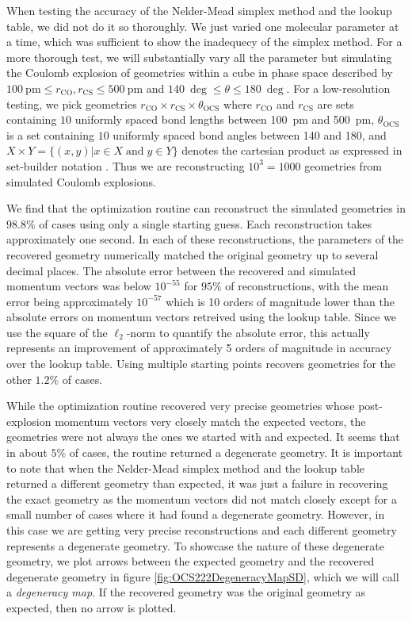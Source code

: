 When testing the accuracy of the Nelder-Mead simplex method and the lookup table, we did not do it so thoroughly. We just varied one molecular parameter at a time, which was sufficient to show the inadequecy of the simplex method. For a more thorough test, we will substantially vary all the parameter but simulating the Coulomb explosion of geometries within a cube in phase space described by $\SI{100}{\pico\meter} \le r_\mathrm{CO}, r_\mathrm{CS} \le \SI{500}{\pico\meter}$ and $\SI{140}{\deg} \le \theta \le \SI{180}{\deg}$. For a low-resolution testing, we pick geometries $r_\mathrm{CO} \times r_\mathrm{CS} \times \theta_\mathrm{OCS}$ where $r_\mathrm{CO}$ and $r_\mathrm{CS}$ are sets containing $10$ uniformly spaced bond lengths between \SI{100}{\pico\meter} and \SI{500}{\pico\meter}, $\theta_\mathrm{OCS}$ is a set containing $10$ uniformly spaced bond angles between \SI{140}{\deg} and \SI{180}{\deg}, and $X \times Y = \lbrace (x,y) | x \in X \;\mathrm{and}\; y \in Y \rbrace$ denotes the cartesian product as expressed in set-builder notation \citep[p. 6]{Warner90}. Thus we are reconstructing $10^3 = 1000$ geometries from simulated Coulomb explosions.

We find that the optimization routine can reconstruct the simulated geometries in $98.8\%$ of cases using only a single starting guess. Each reconstruction takes approximately one second. In each of these reconstructions, the parameters of the recovered geometry numerically matched the original geometry up to several decimal places. The absolute error between the recovered and simulated momentum vectors was below $10^{-55}$ for $95\%$ of reconstructions, with the mean error being approximately $10^{-57}$ which is 10 orders of magnitude lower than the absolute errors on momentum vectors retreived using the lookup table. Since we use the square of the $\ell_2$-norm to quantify the absolute error, this actually represents an improvement of approximately 5 orders of magnitude in accuracy over the lookup table. Using multiple starting points recovers geometries for the other $1.2\%$ of cases.

While the optimization routine recovered very precise geometries whose post-explosion momentum vectors very closely match the expected vectors, the geometries were not always the ones we started with and expected. It seems that in about $5\%$ of cases, the routine returned a degenerate geometry. It is important to note that when the Nelder-Mead simplex method and the lookup table returned a different geometry than expected, it was just a failure in recovering the exact geometry as the momentum vectors did not match closely except for a small number of cases where it had found a degenerate geometry. However, in this case we are getting very precise reconstructions and each different geometry represents a degenerate geometry. To showcase the nature of these degenerate geometry, we plot arrows between the expected geometry and the recovered degenerate geometry in figure \ref{fig:OCS222DegeneracyMapSD}, which we will call a \emph{degeneracy map}. If the recovered geometry was the original geometry as expected, then no arrow is plotted.

